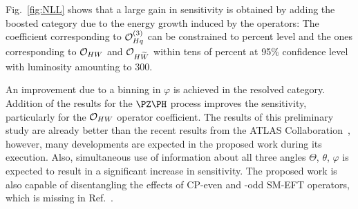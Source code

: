 \documentclass[a4paper,11pt]{article}
\begin{document}
Fig.~\ref{fig:NLL} shows that a large gain in sensitivity is obtained by adding the boosted category due to the energy growth induced by the operators:
The coefficient corresponding to ${\cal O}^{(3)}_{Hq}$ can be constrained to percent level and the ones corresponding to ${\cal O}_{HW}$ and ${\cal O}_{H\widetilde{W}}$ within tens of percent at 95\% confidence level with luminosity amounting to 300\fbinv. 

An improvement due to a binning in $\varphi$ is achieved in the resolved category. 
Addition of the results for the $\PZ\PH$ process improves the sensitivity, particularly for the ${\cal O}_{HW}$ operator coefficient.
The results of this preliminary study are already better than the recent results from the ATLAS Collaboration~\cite{ATLAS-CONF-2021-051},
however, many developments are expected in the proposed work during its execution.
Also, simultaneous use of information about all three angles $\Theta$, $\theta$, $\varphi$ is expected to result in a significant increase in sensitivity.
The proposed work is also capable of disentangling the effects of CP-even and -odd SM-EFT operators, which is missing in Ref.~\cite{ATLAS-CONF-2021-051}. 
\end{document}
